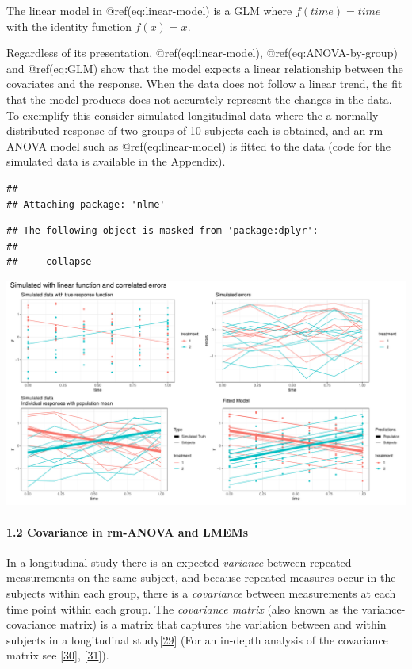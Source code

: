 \documentclass[
]{article}
\begin{document}
The linear model in @ref(eq:linear-model) is a GLM where
\(f(time) = time\) with the identity function \(f(x) = x\).

Regardless of its presentation, @ref(eq:linear-model),
@ref(eq:ANOVA-by-group) and @ref(eq:GLM) show that the model expects a
linear relationship between the covariates and the response. When the
data does not follow a linear trend, the fit that the model produces
does not accurately represent the changes in the data. To exemplify this
consider simulated longitudinal data where the a normally distributed
response of two groups of 10 subjects each is obtained, and an rm-ANOVA
model such as @ref(eq:linear-model) is fitted to the data (code for the
simulated data is available in the Appendix).

\begin{verbatim}
## 
## Attaching package: 'nlme'
\end{verbatim}

\begin{verbatim}
## The following object is masked from 'package:dplyr':
## 
##     collapse
\end{verbatim}

\includegraphics[width=1\linewidth]{Manuscript_AM_v1_files/figure-latex/unnamed-chunk-3-1}

\hypertarget{covariance-in-rm-anova-and-lmems}{%
\paragraph{1.2 Covariance in rm-ANOVA and
LMEMs}\label{covariance-in-rm-anova-and-lmems}}

In a longitudinal study there is an expected \emph{variance} between
repeated measurements on the same subject, and because repeated measures
occur in the subjects within each group, there is a \emph{covariance}
between measurements at each time point within each group. The
\emph{covariance matrix} (also known as the variance-covariance matrix)
is a matrix that captures the variation between and within subjects in a
longitudinal study{[}\protect\hyperlink{ref-wolfinger1996}{29}{]} (For
an in-depth analysis of the covariance matrix see
{[}\protect\hyperlink{ref-west2014}{30}{]},
{[}\protect\hyperlink{ref-weiss2005}{31}{]}).
\end{document}
